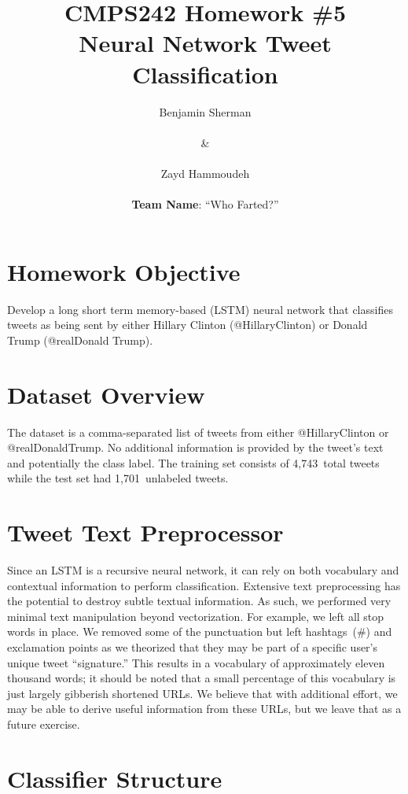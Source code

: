 \documentclass{report}
\title{\textbf{CMPS242 Homework \#5 \textendash{} \\Neural Network Tweet Classification}}
\author{Benjamin Sherman \\~\\ \& \\~\\ Zayd Hammoudeh \\~\\ \textbf{Team Name}: ``Who Farted?''}
\date{} %
\begin{document}
  \maketitle
  
  \suppressfloats %
  \section{Homework Objective}
  
  Develop a long short term memory-based (LSTM) neural network that classifies tweets as being sent by either Hillary Clinton (@HillaryClinton) or Donald Trump (@realDonald Trump).
  
  \section{Dataset Overview}
  
  The dataset is a comma-separated list of tweets from either @HillaryClinton or @realDonaldTrump.  No additional information is provided by the tweet's text and potentially the class label.  The training set consists of 4,743~total tweets while the test set had 1,701~unlabeled tweets.
   
  \section{Tweet Text Preprocessor}\label{sec:textPreprocessor}
  
  Since an LSTM is a recursive neural network, it can rely on both vocabulary and contextual information to perform classification.  Extensive text preprocessing has the potential to destroy subtle textual information.  As such, we performed very minimal text manipulation beyond vectorization.  For example, we left all stop words in place.  We removed some of the punctuation but left hashtags~(\#) and exclamation points as we theorized that they may be part of a specific user's unique tweet ``signature.''  This results in a vocabulary of approximately eleven thousand words; it should be noted that a small percentage of this vocabulary is just largely gibberish shortened URLs.  We believe that with additional effort, we may be able to derive useful information from these URLs, but we leave that as a future exercise.
   
  \section{Classifier Structure}
  
\end{document}
